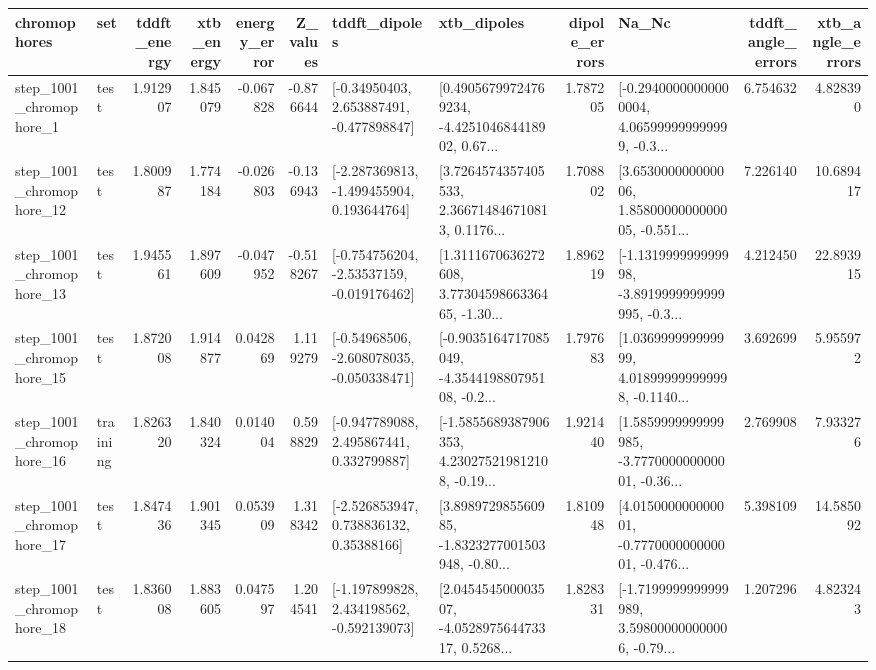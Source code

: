 \begin{tabular}{llrrrrllrlrr}
\toprule
             chromophores &       set &  tddft\_energy &  xtb\_energy &  energy\_error &  Z\_values &                               tddft\_dipoles &                                        xtb\_dipoles &  dipole\_errors &                                              Na\_Nc &  tddft\_angle\_errors &  xtb\_angle\_errors \\
\midrule
  step\_1001\_chromophore\_1 &      test &      1.912907 &    1.845079 &     -0.067828 & -0.876644 &    [-0.34950403, 2.653887491, -0.477898847] &  [0.49056799724769234, -4.425104684418902, 0.67... &       1.787205 &  [-0.29400000000000004, 4.065999999999999, -0.3... &            6.754632 &          4.828390 \\
 step\_1001\_chromophore\_12 &      test &      1.800987 &    1.774184 &     -0.026803 & -0.136943 &   [-2.287369813, -1.499455904, 0.193644764] &  [3.7264574357405533, 2.366714846710813, 0.1176... &       1.708802 &  [3.653000000000006, 1.8580000000000005, -0.551... &            7.226140 &         10.689417 \\
 step\_1001\_chromophore\_13 &      test &      1.945561 &    1.897609 &     -0.047952 & -0.518267 &   [-0.754756204, -2.53537159, -0.019176462] &  [1.3111670636272608, 3.7730459866336465, -1.30... &       1.896219 &  [-1.131999999999998, -3.8919999999999995, -0.3... &            4.212450 &         22.893915 \\
 step\_1001\_chromophore\_15 &      test &      1.872008 &    1.914877 &      0.042869 &  1.119279 &   [-0.54968506, -2.608078035, -0.050338471] &  [-0.9035164717085049, -4.354419880795108, -0.2... &       1.797683 &  [1.036999999999999, 4.018999999999998, -0.1140... &            3.692699 &          5.955972 \\
 step\_1001\_chromophore\_16 &  training &      1.826320 &    1.840324 &      0.014004 &  0.598829 &    [-0.947789088, 2.495867441, 0.332799887] &  [-1.5855689387906353, 4.230275219812108, -0.19... &       1.921440 &  [1.5859999999999985, -3.777000000000001, -0.36... &            2.769908 &          7.933276 \\
 step\_1001\_chromophore\_17 &      test &      1.847436 &    1.901345 &      0.053909 &  1.318342 &     [-2.526853947, 0.738836132, 0.35388166] &  [3.898972985560985, -1.8323277001503948, -0.80... &       1.810948 &  [4.015000000000001, -0.777000000000001, -0.476... &            5.398109 &         14.585092 \\
 step\_1001\_chromophore\_18 &      test &      1.836008 &    1.883605 &      0.047597 &  1.204541 &   [-1.197899828, 2.434198562, -0.592139073] &  [2.045454500003507, -4.052897564473317, 0.5268... &       1.828331 &  [-1.7199999999999989, 3.598000000000006, -0.79... &            1.207296 &          4.823243 \\

\end{tabular}
